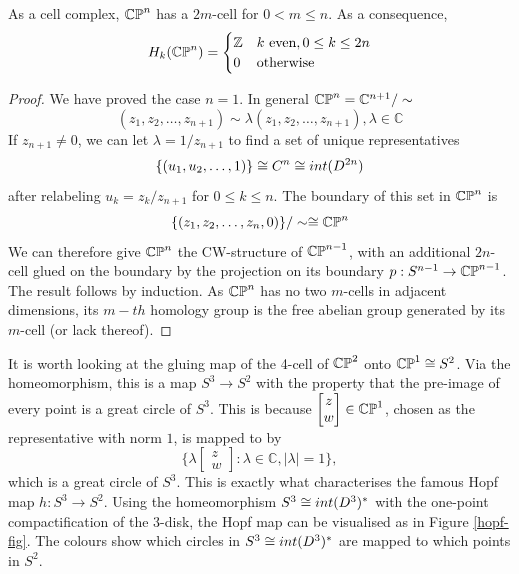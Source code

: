 \begin{prop}
As a cell complex, $\mathbb{CP}^{n}$ has a $2m$-cell for $0<m\leq n$. As a consequence,
$$H_k(\mathbb{CP}^{n})=\begin{cases} 
      \mathbb{Z} & k \text{ even}, 0\leq k \leq 2n \\
      0 & \text{otherwise}
   \end{cases}
$$
\end{prop}
\begin{proof}
We have proved the case $n=1$. In general $\mathbb{CP}^{n}=\mathbb{C}^{n+1}/\sim$
$$(z_1,z_2,\dots,z_{n+1})\sim \lambda (z_1,z_2,\dots,z_{n+1}), \lambda \in \mathbb{C}$$ If $z_{n+1}\neq 0$, we can let $\lambda=1/z_{n+1}$ to find a set of unique representatives
$$\{(u_1,u_2,\dots,1)\}\cong C^{n}\cong int(D^{2n})$$
after relabeling $u_k=z_k/z_{n+1}$ for $0\leq k \leq n$.
The boundary of this set in $\mathbb{CP}^{n}$ is $$\{(z_1,z_2,\dots,z_n,0)\}/\sim \cong \mathbb{CP}^{n}$$ We can therefore give $\mathbb{CP}^{n}$ the CW-structure of $\mathbb{CP}^{n-1}$, with an additional $2n$-cell glued on the boundary by the projection on its boundary $p:S^{n-1}\rightarrow \mathbb{CP}^{n-1}$. The result follows by induction. As $\mathbb{CP}^{n}$ has no two $m$-cells in adjacent dimensions, its $m-th$ homology group is the free abelian group generated by its $m$-cell (or lack thereof).
\end{proof}
\begin{remark}\label{hopf}
It is worth looking at the gluing map of the 4-cell of $\mathbb{CP}^{2}$ onto $\mathbb{CP}^{1}\cong S^{2}$. Via the homeomorphism, this is a map $S^{3}\rightarrow S^{2}$ with the property that the pre-image of every point is a great circle of $S^3$. This is because $\begin{bmatrix}z\\w \end{bmatrix}\in \mathbb{CP}^{1}$, chosen as the representative with norm $1$, is mapped to by $$\{\lambda \begin{bmatrix}z\\w \end{bmatrix} : \lambda\in \mathbb{C},|\lambda|=1\},$$ which is a great circle of $S^{3}$. This is exactly what characterises the famous Hopf map $h:S^3\rightarrow S^2$. Using the homeomorphism $S^3\cong int(D^3)^*$ with the one-point compactification of the $3$-disk, the Hopf map can be visualised as in Figure \ref{hopf-fig}. The colours show which circles in $S^3\cong int(D^3)^*$ are mapped to which points in $S^2$.
\end{remark}
